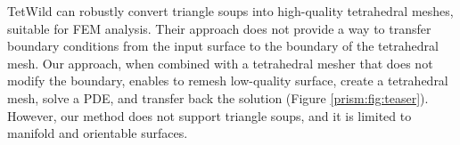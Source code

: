 TetWild \cite{hu2018tetrahedral,Hu:2019:fTetWild}
can robustly convert triangle soups into high-quality tetrahedral meshes, suitable for FEM analysis. Their approach does not provide a way to transfer boundary conditions from the input surface to the boundary of the tetrahedral mesh. Our approach, when combined with a tetrahedral mesher that does not modify the boundary, enables to remesh low-quality surface, create a tetrahedral mesh, solve a PDE, and transfer back the solution (Figure \ref{prism:fig:teaser}). However, our method does not support triangle soups, and it is limited to manifold and orientable surfaces.

